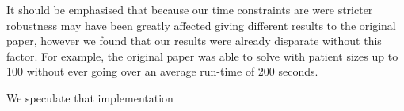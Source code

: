 It should be emphasised that because our time constraints are were stricter robustness may have been greatly affected giving different results to the original paper, however we found that our results were already disparate without this factor. For example, the original paper was able to solve with patient sizes up to 100 without ever going over an average run-time of 200 seconds.

We speculate that implementation


